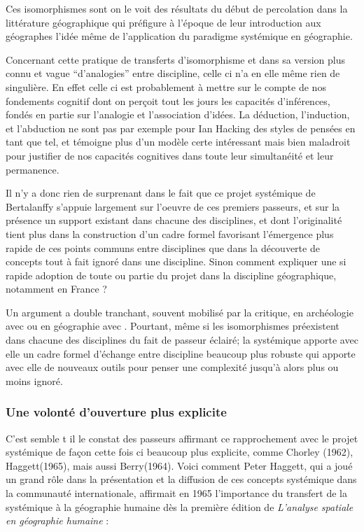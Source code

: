 {Ces isomorphismes sont on le voit des résultats du début de percolation dans la littérature géographique qui préfigure à l'époque de leur introduction aux géographes l'idée même de l'application du paradigme systémique en géographie.

Concernant cette pratique de transferts d'isomorphisme et dans sa version plus connu et vague \enquote{d'analogies} entre discipline, celle ci n'a en elle même rien de singulière. En effet celle ci est probablement à mettre sur le compte de nos fondements cognitif dont on perçoit tout les jours les capacités d'inférences, fondés en partie sur l’analogie et l'association d'idées. La déduction, l'induction, et l'abduction ne sont pas par exemple pour Ian Hacking des styles de pensées en tant que tel, et témoigne plus d'un modèle certe intéressant mais bien maladroit pour justifier de nos capacités cognitives dans toute leur simultanéité et leur permanence.

Il n'y a donc rien de surprenant dans le fait que ce projet systémique de Bertalanffy s'appuie largement sur l'oeuvre de ces premiers passeurs, et sur la présence un support existant dans chacune des disciplines, et dont l'originalité tient plus dans la construction d'un cadre formel favorisant l'émergence plus rapide de ces points communs entre disciplines que dans la découverte de concepts tout à fait ignoré dans une discipline. Sinon comment expliquer une si rapide adoption de toute ou partie du projet dans la discipline géographique, notamment en France ? 

Un argument a double tranchant, souvent mobilisé par la critique, en archéologie avec \textcite{Salmon1978} ou en géographie avec \textcite{Chisholm1967}. Pourtant, même si les isomorphismes préexistent dans chacune des disciplines du fait de passeur éclairé; la systémique apporte avec elle un cadre formel d'échange entre discipline beaucoup plus robuste qui apporte avec elle de nouveaux outils pour penser une complexité jusqu'à alors plus ou moins ignoré.  %

\subsubsection{Une volonté d'ouverture plus explicite}

C'est semble t il le constat des passeurs affirmant ce rapprochement avec le projet systémique de façon cette fois ci beaucoup plus explicite, comme Chorley (1962), Haggett(1965), mais aussi Berry(1964). Voici comment Peter Haggett, qui a joué un grand rôle dans la présentation et la diffusion de ces concepts systémique dans la communauté internationale, affirmait en 1965 l'importance du transfert de la systémique à la géographie humaine dès la première édition de \textit{L’analyse spatiale en géographie humaine} : 

}
